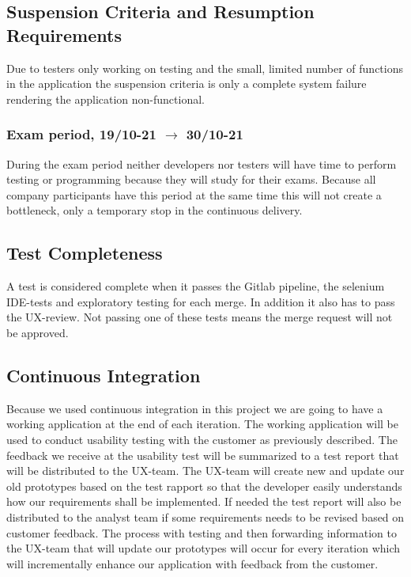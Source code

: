 \subsection{Suspension Criteria and Resumption Requirements}
Due to testers only working on testing and the small, limited number of functions in the application the suspension criteria is only a complete system failure rendering the application non-functional.%
\subsubsection{Exam period, 19/10-21 $\xrightarrow{}$ 30/10-21}
During the exam period neither developers nor testers will have time to perform testing or programming because they will study for their exams. Because all company participants have this period at the same time this will not create a bottleneck, only a temporary stop in the continuous delivery.
\subsection{Test Completeness}
A test is considered complete when it passes the Gitlab pipeline, the selenium IDE-tests and exploratory testing for each merge. In addition it also has to pass the UX-review. Not passing one of these tests means the merge request will not be approved. 

\subsection{Continuous Integration}
Because we used continuous integration in this project we are going to have a working application at the end of each iteration. The working application will be used to conduct usability testing with the customer as previously described. The feedback we receive at the usability test will be summarized to a test report that will be distributed to the UX-team. The UX-team will create new and update our old prototypes based on the test rapport so that the developer easily understands how our requirements shall be implemented. If needed the test report will also be distributed to the analyst team if some requirements needs to be revised based on customer feedback. The process with testing and then forwarding information to the UX-team that will update our prototypes will occur for every iteration which will incrementally enhance our application with feedback from the customer.